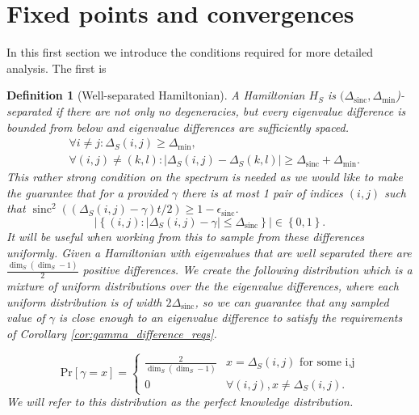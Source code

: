 \documentclass{article}
\newtheorem{definition}{Definition}
\newcommand{\abs}[1]{\left| #1 \right|}
\newcommand{\set}[1]{\left\{ #1 \right\}}
\newcommand{\prob}[1]{\text{Pr}\left[ #1 \right]}
\DeclareMathOperator{\sinc}{sinc}
\begin{document}
\section{Fixed points and convergences}

In this first section we introduce the conditions required for more detailed analysis. The first is 
\begin{definition}[Well-separated Hamiltonian] \label{def:separated_hamiltonians}
    A Hamiltonian $H_S$ is $(\Delta_{\sinc}, \Delta_{\min}$)-separated if there are not only no degeneracies, but every eigenvalue difference is bounded from below and eigenvalue differences are sufficiently spaced.
    \begin{align}
        &\forall i \neq j : \Delta_{S}(i,j) \geq \Delta_{\min}, \\
        &\forall (i,j) \neq (k,l) : \abs{\Delta_S(i,j) - \Delta_S(k,l)} \geq \Delta_{\sinc} + \Delta_{\min}.
    \end{align}
    This rather strong condition on the spectrum is needed as we would like to make the guarantee that for a provided $\gamma$ there is at most 1 pair of indices $(i,j)$ such that $\sinc^2((\Delta_S(i,j) - \gamma)t/2) \geq 1 - \epsilon_{\sinc}$.
    \begin{equation}
        \abs{\set{(i,j): \abs{\Delta_S(i,j) - \gamma} \leq \Delta_{\sinc}}} \in \set{0, 1}.
    \end{equation}
    It will be useful when working from this to sample from these differences uniformly. Given a Hamiltonian with eigenvalues that are well separated there are $\frac{\dim_S (\dim_S - 1)}{2}$ positive differences. We create the following distribution which is a mixture of uniform distributions over the the eigenvalue differences, where each uniform distribution is of width $2 \Delta_{\sinc}$, so we can guarantee that any sampled value of $\gamma$ is close enough to an eigenvalue difference to satisfy the requirements of Corollary \ref{cor:gamma_difference_reqs}.

    \begin{equation}
        \prob{\gamma = x} = \begin{cases}
            \frac{2}{\dim_S (\dim_S - 1)}
            & x = \Delta_S(i,j) \text{ for some i,j} \\
            0 & \forall (i,j), x \neq \Delta_S(i,j).
        \end{cases}
    \end{equation}
    We will refer to this distribution as the \emph{perfect knowledge} distribution.
\end{definition}
\end{document}
